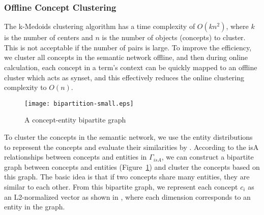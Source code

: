 \subsubsection{Offline Concept Clustering}
The k-Medoids clustering algorithm has a time complexity of $O(kn^{2})$,
where $k$ is the number of centers and $n$ is the number of objects (concepts)
to cluster.
This is not acceptable if the number of pairs is large.
To improve the efficiency, we cluster all concepts
in the semantic network offline, and then during online calculation,
each concept in a term's context can be quickly mapped to an offline cluster
which acts as synset, and this effectively reduces the online clustering
complexity to $O(n)$.

\begin{figure}[th]
 \centerline{
 \texttt{[image: bipartition-small.eps]}}
\caption{A concept-entity bipartite graph} \label{fig:bipartition}
\end{figure}

To cluster the concepts in the semantic network, we use the entity distributions to represent the concepts and evaluate their similarities by . According to the isA relationships between concepts and entities in $\Gamma_{isA}$, we can construct a bipartite graph
between concepts and entities (Figure~\ref{fig:bipartition}) and cluster the concepts based on this graph. The basic idea is that if two
concepts share many entities, they are similar to each other. From this bipartite graph, we represent each concept $c_i$ as an L2-normalized
vector as shown in , where each dimension corresponds to an entity in the graph.

